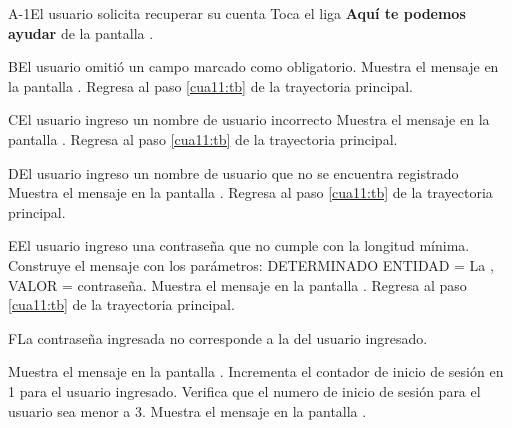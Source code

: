  \begin{UCtrayectoriaA}{A-1}{El usuario solicita recuperar su cuenta}
	\UCpaso[\UCactor] Toca el liga \textbf{Aquí te podemos ayudar} de la pantalla .\label{cua11:pe} 
\end{UCtrayectoriaA}

 \begin{UCtrayectoriaA}{B}{El usuario omitió un campo marcado como obligatorio.}
 	\UCpaso[\UCsist] Muestra el mensaje  en la pantalla .
	\UCpaso[] Regresa al paso \ref{cua11:tb} de la trayectoria principal. 
	
\end{UCtrayectoriaA}


 \begin{UCtrayectoriaA}{C}{El usuario ingreso un nombre de usuario incorrecto}
	\UCpaso[\UCsist] Muestra el mensaje  en la pantalla .
	\UCpaso[] Regresa al paso \ref{cua11:tb} de la trayectoria principal. 
	
\end{UCtrayectoriaA}

 \begin{UCtrayectoriaA}{D}{El usuario ingreso un nombre de usuario que no se encuentra registrado}
	\UCpaso[\UCsist] Muestra el mensaje  en la pantalla .
	\UCpaso[] Regresa al paso \ref{cua11:tb} de la trayectoria principal. 
	
\end{UCtrayectoriaA}

 \begin{UCtrayectoriaA}{E}{El usuario ingreso una contraseña que no cumple con la longitud mínima.}
 	\UCpaso[\UCsist] Construye el mensaje  con los parámetros: DETERMINADO ENTIDAD = La , VALOR = contraseña.
	\UCpaso[\UCsist] Muestra el mensaje  en la pantalla .
	\UCpaso[] Regresa al paso \ref{cua11:tb} de la trayectoria principal. 
\end{UCtrayectoriaA}

 \begin{UCtrayectoriaA}{F}{La contraseña ingresada no corresponde a la del usuario ingresado.}
	
	\UCpaso[\UCsist] Muestra el mensaje  en la pantalla .
	\UCpaso[\UCsist] Incrementa el contador de inicio de sesión en 1 para el usuario ingresado.
	\UCpaso[\UCsist] Verifica que el numero de inicio de sesión para el usuario sea menor a 3. 
	\UCpaso[\UCsist] Muestra el mensaje  en la pantalla .
	
\end{UCtrayectoriaA}

